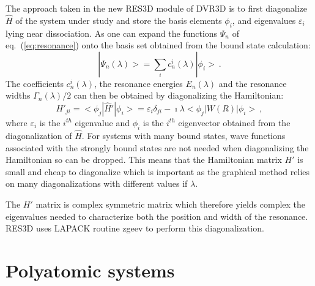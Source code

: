 \documentclass[12pt]{article}
\newcommand{\2}{$_{2}$}
\newcommand{\3}{$_{3}$}
\newcommand{\4}{$_{4}$}
\begin{document}
The approach taken in the new {\sc RES3D} module of  {\sc DVR3D} is to first diagonalize $\hat{H}$ of
the system under study and store the basis elements $\phi_i$, and
eigenvalues $\varepsilon_i$ lying near dissociation.  As one
can expand the functions $\Psi_n$ of eq.~(\ref{eq:resonance}) onto the basis
set obtained from the bound state calculation:
%
\begin{equation} \label{eq:wave}
|\Psi_n(\lambda)> = \sum_i c^i_{n}(\lambda)|\phi_i>\ .
\end{equation}
%
The coefficients $c^i_n(\lambda)$, the resonance energies
$E_n(\lambda)$ and the resonance widths $\Gamma_n(\lambda)/2$ can then
be obtained by diagonalizing the Hamiltonian:
%
\begin{equation} \label{eq:capdiag}
H'_{ji}= <\phi_j|\hat{H}'|\phi_i>= \varepsilon_i\delta_{ji} - \imath \lambda
<\phi_j|W(R)|\phi_i> \ ,
\end{equation}
%
where $\varepsilon_i$ is the $i^{th}$ eigenvalue and $\phi_i$ is the
$i^{th}$ eigenvector obtained from the diagonalization of $\hat{H}$.
For systems with many bound states, wave functions associated with the
strongly bound states are not needed when diagonalizing the Hamiltonian so can
be dropped. This means that the  Hamiltonian matrix $H'$ is small and
cheap to diagonalize which is important as the graphical method relies
on many diagonalizations with different values if $\lambda$.

The $H'$ matrix is complex symmetric matrix which therefore yields
complex the eigenvalues needed to characterize both the position and
width of the resonance. {\sc RES3D} uses LAPACK \cite{99AnBaBi.method} routine {\sc zgeev}
to perform this diagonalization.


\section{Polyatomic systems}
\end{document}
